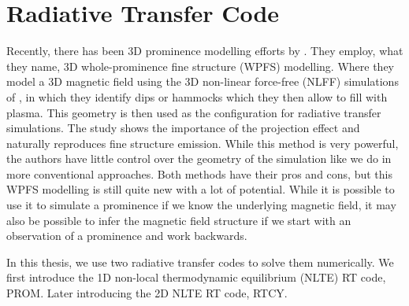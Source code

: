 \section{Radiative Transfer Code}

Recently, there has been 3D prominence modelling efforts by \citep{gunar_3d_2015}. They employ, what they name, 3D whole-prominence fine structure (WPFS) modelling. Where they model a 3D magnetic field using the 3D non-linear force-free (NLFF) simulations of \cite{mackay_non-linear_2009}, in which they identify dips or hammocks which they then allow to fill with plasma. This geometry is then used as the configuration for radiative transfer simulations. The study shows the importance of the projection effect and naturally reproduces fine structure emission. While this method is very powerful, the authors have little control over the geometry of the simulation like we do in more conventional approaches. Both methods have their pros and cons, but this WPFS modelling is still quite new with a lot of potential. While it is possible to use it to simulate a prominence if we know the underlying magnetic field, it may also be possible to infer the magnetic field structure if we start with an observation of a prominence and work backwards. 

In this thesis, we use two radiative transfer codes to solve them numerically. We first introduce the 1D non-local thermodynamic equilibrium (NLTE) RT code, PROM. Later introducing the 2D NLTE RT code, RTCY.

